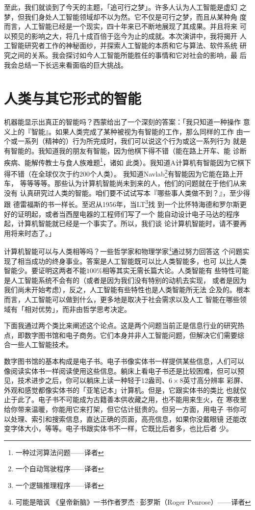 \documentclass[12pt,a4paper]{article}
\begin{document}
至此，我们就谈到了今天的主题，「追可行之梦」。许多人认为人工智能是虚幻
之梦，但我们身处人工智能领域却不以为然。它不仅是可行之梦，而且从某种角
度而言，人工智能已经是一个现实，四十年来已不断地展现了其成果。并且将来
可以预见的影响之大，将几十成百倍于迄今为止的成就。本次演讲中，我将揭开
人工智能研究者工作的神秘面纱，并探索人工智能的本质和它与算法、软件系统
研究之间的关系。我会探讨如今人工智能所能胜任的事情和它对社会的影响，最
后我会总结一下长远来看面临的巨大挑战。

\section{人类与其它形式的智能}

机器能显示出真正的智能吗？西蒙给出了一个深刻的答案：「我只知道一种操作
意义上的『智能』。如果人类完成了某种被视为有智能的工作，那么同样的工作
由一个或一系列（精神的）行为所完成时，我们可以说这个行为或这一系列行为
就是有智能的。我知道我的朋友有智能，因为他棋下得不错（能在路上开车、能
诊断疾病、能解传教士与食人族难题\footnote{一种过河算法问题——译者}，诸如
此类）。我知道A计算机有智能因为它棋下得不错（在全球仅次于约200个人类）。
我知道Navlab\footnote{一个自动驾驶程序——译者}有智能因为它能在路上开车，
等等等等。那些认为计算机智能尚未到来的人，他们的问题就在于他们从来没有
认真研究过人类的智能。咱们要不试试写本『哪些事人类做不到？』，至少得跟
德雷福斯的书一样长。至迟从1956年，当LT\footnote{一个逻辑推理程序——译者}找
到一个比怀特海德和罗尔斯更好的证明起，或者当西屋电器的工程师们写了一个
能自动设计电子马达的程序起，计算机智能就已经是一个事实了。所以，我们谈
论计算机智能时，请不要再用将来时态了。」

计算机智能可以与人类相等吗？一些哲学家和物理学家\footnote{可能是暗讽
  《皇帝新脑》一书作者罗杰·彭罗斯（Roger Penrose）——译者}通过努力回答这
个问题实现了相当成功的终身事业。答案是人工智能既可以比人类智能多，也可
以比人类智能少。要证明这两者不能$100\%$相等其实无需长篇大论。人类智能有
些特性可能是人工智能系统不会有的（或者是因为我们没有特别的动机去实现，
或者是因为我们尚未开始考虑），反之，人工智能有些特性也是人类智能所无法
企及的。根本而言，人工智能可以做到什么，更多地是取决于社会需求以及人工
智能在哪些领域有「相对优势」，而非由哲学思考决定。

下面我通过两个类比来阐述这个论点。这是两个问题当前正是信息行业的研究热
点，即数字图书馆和电子商务。它们本身并非人工智能问题，但解决它们需要综
合一些人工智能技术。

数字图书馆的基本构成是电子书。电子书像实体书一样提供某些信息，人们可以
像阅读实体书一样阅读使用这些信息。躺床上看电子书还是比较困难，但可以预
见，技术进步之后，你可以躺床上读一种轻于12盎司、$6\times8$英寸高分辨率
彩屏、外观和感觉都像实体书的「亚笔记本」计算机。但是，它跟实体书的类比
也就仅止于此了。电子书不可能成为古籍善本供收藏之用，也不能用来生火，在
寒夜里给你带来温暖，你能用它来打架，但它估计挺贵的。但另一方面，用电子
书你可以处理、索引和搜索信息，直达正确的页面，高亮信息，如果你没戴眼镜
还能改变字体大小，等等。电子书跟实体书不一样，它既比后者多，也比后者
少。
\end{document}
